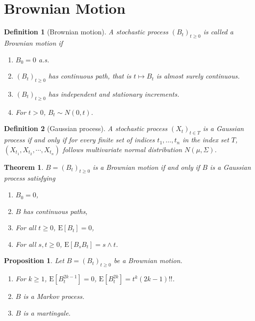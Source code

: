 \documentclass{article}
\newtheorem{definition}{Definition}[section]
\newtheorem{proposition}{Proposition}[section]
\newtheorem{theorem}{Theorem}[section]
\theoremstyle{nonumberplain}
\begin{document}
\section{Brownian Motion}
\begin{definition}[Brownian motion]
	A stochastic process $(B_t)_{t\ge0}$ is called a \emph{Brownian motion} if
	\begin{enumerate}
		\item $B_0=0$ a.s.
		\item $(B_t)_{t\ge0}$ has continuous path, that is $t\mapsto B_t$ is almost surely continuous.
		\item $(B_t)_{t\ge0}$ has independent and stationary increments.
		\item For $t>0$, $B_t\sim N(0,t)$.
	\end{enumerate}
\end{definition}

\begin{definition}[Gaussian process]
	A stochastic process $(X_t)_{t\in T}$ is a \emph{Gaussian process} if and only if for every finite set of indices $t_{1},\ldots ,t_{n}$ in the index set $T$, $(X_{t_1},X_{t_2},\cdots,X_{t_n})$ follows multivariate normal distribution $N(\mu,\Sigma)$.
\end{definition}

\begin{theorem}
	$B=(B_t)_{t\ge0}$ is a Brownian motion if and only if $B$ is a Gaussian process satisfying
	\begin{enumerate}
		\item $B_0=0$,
		\item $B$ has continuous paths,
		\item For all $t\ge0$, $\mathrm{E}[B_t]=0$,
		\item For all $s,t\ge0$, $\mathrm{E}[B_sB_t]=s\wedge t$.
	\end{enumerate}
\end{theorem}
\begin{proposition}
	Let $B=(B_t)_{t\ge0}$ be a Brownian motion.
	\begin{enumerate}
		\item For $k\ge1$, $\mathrm{E}[B_t^{2k-1}]=0$, $\mathrm{E}[B_t^{2k}]=t^{k}(2k-1)!!$.
		\item $B$ is a Markov process. 
		\item $B$ is a martingale.
	\end{enumerate}
\end{proposition}
\end{document}
